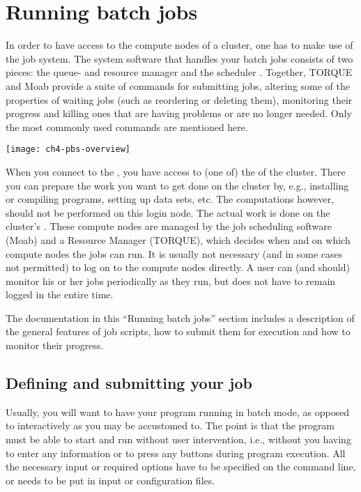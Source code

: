 \chapter{Running batch jobs}
\label{ch:running-batch-jobs}

In order to have access to the compute nodes of a cluster, one has to make use
of the job system. The system software that handles your batch jobs consists of
two pieces: the queue- and resource manager  and the scheduler
. Together, TORQUE and Moab provide a suite of commands for
submitting jobs, altering some of the properties of waiting jobs (such as
reordering or deleting them), monitoring their progress and killing ones that
are having problems or are no longer needed. Only the most commonly used
commands are mentioned here.

\texttt{[image: ch4-pbs-overview]}

When you connect to the \hpc, you have access to (one of) the  of the cluster. There you can prepare the work you want to get done on
the cluster by, e.g., installing or compiling programs, setting up data sets,
etc. The computations however, should not be performed on this login node. The
actual work is done on the cluster's . These compute
nodes are managed by the job scheduling software (Moab) and a Resource Manager
(TORQUE), which decides when and on which compute nodes the jobs can run. It is
usually not necessary (and in some cases not permitted) to log on to the
compute nodes directly. A user can (and should) monitor his or her jobs
periodically as they run, but does not have to remain logged in the entire
time.

The documentation in this ``Running batch jobs'' section includes a description
of the general features of job scripts, how to submit them for execution and
how to monitor their progress.

\section{Defining and submitting your job}

Usually, you will want to have your program running in batch mode, as opposed
to interactively as you may be accustomed to. The point is that the program
must be able to start and run without user intervention, i.e., without you
having to enter any information or to press any buttons during program
execution. All the necessary input or required options have to be specified on
the command line, or needs to be put in input or configuration files.

